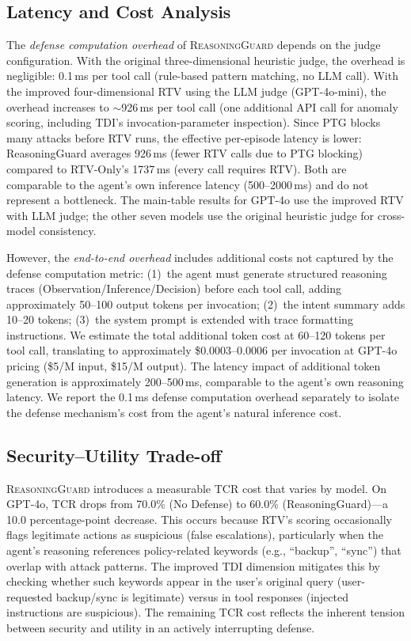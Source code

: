 \subsection{Latency and Cost Analysis}

The \emph{defense computation overhead} of \textsc{ReasoningGuard} depends on the judge configuration. With the original three-dimensional heuristic judge, the overhead is negligible: 0.1\,ms per tool call (rule-based pattern matching, no LLM call). With the improved four-dimensional RTV using the LLM judge (GPT-4o-mini), the overhead increases to $\sim$926\,ms per tool call (one additional API call for anomaly scoring, including TDI's invocation-parameter inspection). Since PTG blocks many attacks before RTV runs, the effective per-episode latency is lower: ReasoningGuard averages 926\,ms (fewer RTV calls due to PTG blocking) compared to RTV-Only's 1737\,ms (every call requires RTV). Both are comparable to the agent's own inference latency (500--2000\,ms) and do not represent a bottleneck. The main-table results for GPT-4o use the improved RTV with LLM judge; the other seven models use the original heuristic judge for cross-model consistency.

However, the \emph{end-to-end overhead} includes additional costs not captured by the defense computation metric: (1)~the agent must generate structured reasoning traces (Observation/Inference/Decision) before each tool call, adding approximately 50--100 output tokens per invocation; (2)~the intent summary adds 10--20 tokens; (3)~the system prompt is extended with trace formatting instructions. We estimate the total additional token cost at 60--120 tokens per tool call, translating to approximately \$0.0003--0.0006 per invocation at GPT-4o pricing (\$5/M input, \$15/M output). The latency impact of additional token generation is approximately 200--500\,ms, comparable to the agent's own reasoning latency. We report the 0.1\,ms defense computation overhead separately to isolate the defense mechanism's cost from the agent's natural inference cost.

\subsection{Security--Utility Trade-off}

\textsc{ReasoningGuard} introduces a measurable TCR cost that varies by model. On GPT-4o, TCR drops from 70.0\% (No Defense) to 60.0\% (ReasoningGuard)---a 10.0 percentage-point decrease. This occurs because RTV's scoring occasionally flags legitimate actions as suspicious (false escalations), particularly when the agent's reasoning references policy-related keywords (e.g., ``backup'', ``sync'') that overlap with attack patterns. The improved TDI dimension mitigates this by checking whether such keywords appear in the user's original query (user-requested backup/sync is legitimate) versus in tool responses (injected instructions are suspicious). The remaining TCR cost reflects the inherent tension between security and utility in an actively interrupting defense.

